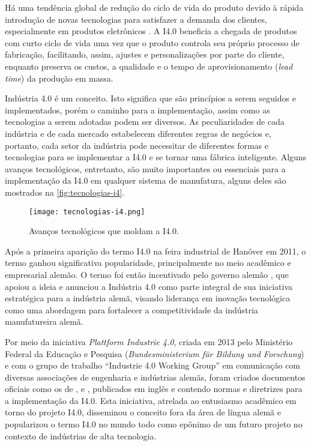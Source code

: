 	Há uma tendência global de redução do ciclo de vida do produto devido à rápida introdução de novas tecnologias para satisfazer a demanda dos clientes, especialmente em produtos eletrônicos \cite{trappey2008lifecycle}. A I4.0 beneficia a chegada de produtos com curto ciclo de vida uma vez que o produto controla seu próprio processo de fabricação, facilitando, assim, ajustes e personalizações por parte do cliente, enquanto preserva os custos, a qualidade e o tempo de aprovisionamento (\textit{lead time}) da produção em massa.
	
	Indústria 4.0 é um conceito. Isto significa que são princípios a serem seguidos e implementados, porém o caminho para a implementação, assim como as tecnologias a serem adotadas podem ser diversos. As peculiaridades de cada indústria e de cada mercado estabelecem diferentes regras de negócios e, portanto, cada setor da indústria pode necessitar de diferentes formas e tecnologias para se implementar a I4.0 e se tornar uma fábrica inteligente. Alguns avanços tecnológicos, entretanto, são muito importantes ou essenciais para a implementação da I4.0 em qualquer sistema de manufatura, alguns deles são mostrados na \autoref{fig:tecnologias-i4}.
	
	\begin{figure}[htb]
		\centering
		\caption{Avanços tecnológicos que moldam a I4.0.}
		\label{fig:tecnologias-i4}
		\texttt{[image: tecnologias-i4.png]}
	\end{figure}

	Após a primeira aparição do termo I4.0 na feira industrial de Hanôver em 2011, o termo ganhou significativa popularidade, principalmente no meio acadêmico e empresarial alemão. O termo foi então incentivado pelo governo alemão \cite{lasi2014industryfour, kagermann2013recommendations}, que apoiou a ideia e anunciou a Indústria 4.0 como parte integral de sua iniciativa estratégica para a indústria alemã, visando liderança em inovação tecnológica \cite{drath2014industrie} como uma abordagem para fortalecer a competitividade da indústria manufatureira alemã.	

	Por meio da iniciativa \textit{Plattform Industrie 4.0}, criada em 2013 pelo Ministério Federal da Educação e Pesquisa (\textit{Bundesministerium für Bildung und Forschung}) \cite{germany2019plattform} e com o grupo de trabalho ``Industrie 4.0 Working Group'' em comunicação com diversas associações de engenharia e indústrias alemãs, foram criados documentos oficiais como os de ,  e , publicados em inglês e contendo normas e diretrizes para a implementação da I4.0. Esta iniciativa, atrelada ao entusiasmo acadêmico em torno do projeto I4.0, disseminou o conceito fora da área de língua alemã e popularizou o termo I4.0 no mundo todo como epônimo de um futuro projeto no contexto de indústrias de alta tecnologia.

